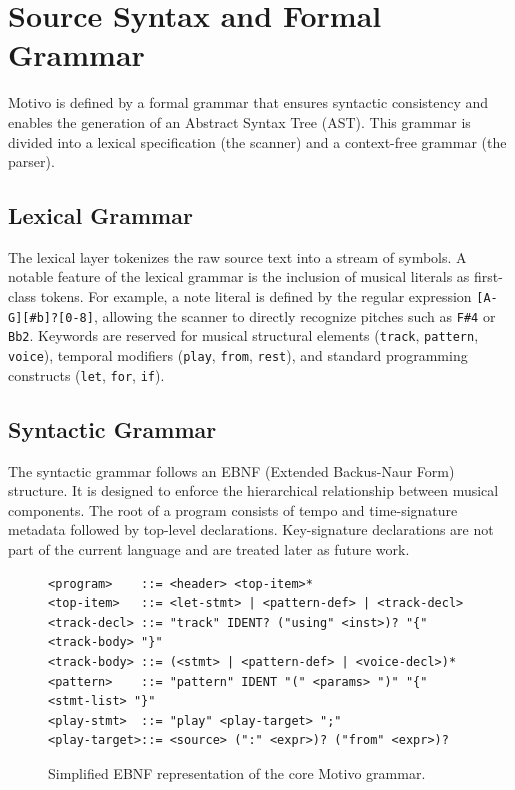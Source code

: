 \section{Source Syntax and Formal Grammar}\label{sec:source-grammar}

Motivo is defined by a formal grammar that ensures syntactic consistency and enables the generation of an
Abstract Syntax Tree (AST).
This grammar is divided into a lexical specification (the scanner) and a context-free grammar (the parser).

\subsection{Lexical Grammar}\label{detail-subsec:lexical-grammar}

The lexical layer tokenizes the raw source text into a stream of symbols.
A notable feature of the lexical grammar is the inclusion of musical literals as first-class tokens.
For example, a note literal is defined by the regular expression \verb|[A-G][#b]?[0-8]|, allowing the scanner to
directly recognize pitches such as \texttt{F\#4} or \texttt{Bb2}.
Keywords are reserved for musical structural elements (\texttt{track}, \texttt{pattern}, \texttt{voice}), temporal
modifiers (\texttt{play}, \texttt{from}, \texttt{rest}), and standard programming constructs (\texttt{let},
\texttt{for}, \texttt{if}).

\subsection{Syntactic Grammar}\label{detail-subsec:syntactic-grammar}

The syntactic grammar follows an EBNF (Extended Backus-Naur Form) structure.
It is designed to enforce the hierarchical relationship between musical components.
The root of a program consists of tempo and time-signature metadata followed by top-level declarations.
Key-signature declarations are not part of the current language and are treated later as future work.

\begin{figure}[htbp]
  \centering
  \begin{lstlisting}[basicstyle=\ttfamily\scriptsize,breaklines=true]
<program>    ::= <header> <top-item>*
<top-item>   ::= <let-stmt> | <pattern-def> | <track-decl>
<track-decl> ::= "track" IDENT? ("using" <inst>)? "{" <track-body> "}"
<track-body> ::= (<stmt> | <pattern-def> | <voice-decl>)*
<pattern>    ::= "pattern" IDENT "(" <params> ")" "{" <stmt-list> "}"
<play-stmt>  ::= "play" <play-target> ";"
<play-target>::= <source> (":" <expr>)? ("from" <expr>)?
  \end{lstlisting}
  \caption{Simplified EBNF representation of the core Motivo grammar.}\label{fig:grammar-ebnf}
\end{figure}

